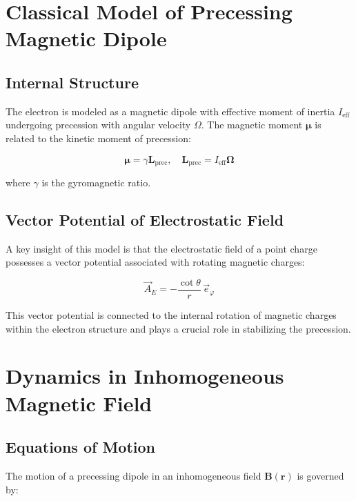 \documentclass[12pt]{article}
\begin{document}
\section{Classical Model of Precessing Magnetic Dipole}

\subsection{Internal Structure}

The electron is modeled as a magnetic dipole with effective moment of inertia $I_{\text{eff}}$ undergoing precession with angular velocity $\Omega$. The magnetic moment $\boldsymbol{\mu}$ is related to the kinetic moment of precession:

\begin{equation}
\boldsymbol{\mu} = \gamma \boldsymbol{L}_{\text{prec}}, \quad \boldsymbol{L}_{\text{prec}} = I_{\text{eff}} \boldsymbol{\Omega}
\end{equation}

where $\gamma$ is the gyromagnetic ratio.

\subsection{Vector Potential of Electrostatic Field}

A key insight of this model is that the electrostatic field of a point charge possesses a vector potential associated with rotating magnetic charges:

\begin{equation}
\vec{A}_E = -\frac{\cot\theta}{r} \, \vec{e}_\varphi
\end{equation}

This vector potential is connected to the internal rotation of magnetic charges within the electron structure and plays a crucial role in stabilizing the precession.

\section{Dynamics in Inhomogeneous Magnetic Field}

\subsection{Equations of Motion}

The motion of a precessing dipole in an inhomogeneous field $\boldsymbol{B}(\boldsymbol{r})$ is governed by:
\end{document}
